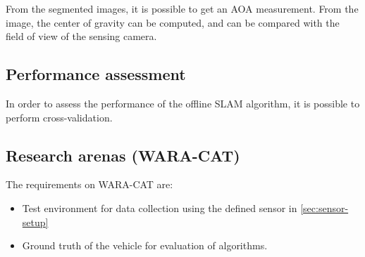 From the segmented images, it is possible to get an \gls{AOA}
measurement. From the image, the center of gravity can be computed,
and can be compared with the field of view of the sensing camera.

\subsection{Performance assessment}

In order to assess the performance of the offline \gls{SLAM}
algorithm, it is possible to perform cross-validation.

\subsection{Research arenas (WARA-CAT)}


The requirements on WARA-CAT are:
\begin{itemize}
  \item Test environment for data collection using the defined sensor in
    \ref{sec:sensor-setup}
\item Ground truth of the vehicle for evaluation of algorithms.
\end{itemize}


